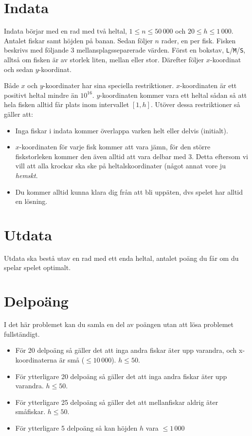 \section*{Indata}

Indata börjar med en rad med två heltal, $1 \leq n \leq 50\,000$ och $20 \leq
h \leq 1\,000$. Antalet fiskar samt höjden på banan. Sedan följer $n$ rader,
en per fisk. Fisken beskrivs med följande 3 mellansplagsseparerade värden.
Först en bokstav, \texttt{L}/\texttt{M}/\texttt{S}, alltså om fisken är av
storlek liten, mellan eller stor. Därefter följer $x$-koordinat och sedan
$y$-koordinat.

Både $x$ och $y$-koordinater har sina speciella restriktioner. $x$-koordinaten
är ett positivt heltal mindre än $10^{16}$. $y$-koordinaten kommer vara ett
heltal sådan så att hela fisken alltid får plats inom intervallet $[1, h]$.
Utöver dessa restriktioner så gäller att:

\begin{itemize}
  \item
    Inga fiskar i indata kommer överlappa varken helt eller delvis (initialt).
  \item
      $x$-koordinaten för varje fisk kommer att vara jämn, för den större
      fiskstorleken kommer den även alltid att vara delbar med 3. Detta
      eftersom vi vill att alla krockar ska ske på heltalskoordinater (något
      annat vore ju \emph{hemskt}.
  \item
    Du kommer alltid kunna klara dig från att bli uppäten, dvs spelet har
    alltid en lösning.
\end{itemize}

\section*{Utdata}
Utdata ska bestå utav en rad med ett enda heltal, antalet poäng du får om du spelar spelet optimalt.

\section*{Delpoäng}
I det här problemet kan du samla en del av poängen utan att lösa problemet fullständigt.

\begin{itemize}
    \item För 20 delpoäng så gäller det att inga andra fiskar äter upp
          varandra, och x-koordinaterna är små ($\leq 10\,000$). $h \leq 50$.
    \item För ytterligare 20 delpoäng så gäller det att inga andra fiskar
          äter upp varandra. $h \leq 50$.
    \item För ytterligare 25 delpoäng så gäller det att mellanfiskar aldrig
          äter småfiskar. $h \leq 50$.
    \item För ytterligare 5 delpoäng så kan höjden $h$ vara $\leq 1\,000$
\end{itemize}
